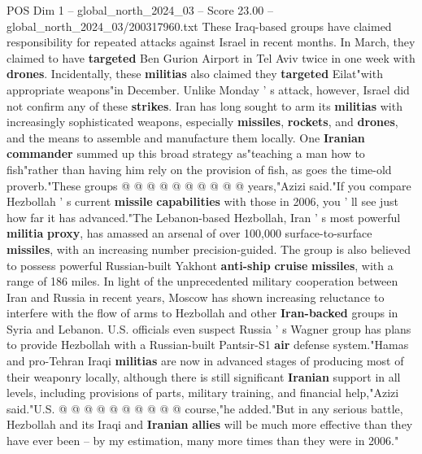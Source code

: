 \begin{textsample}{POS Dim 1 – global\_north\_2024\_03 – Score 23.00 – global\_north\_2024\_03/200317960.txt}
These Iraq-based groups have claimed responsibility for repeated attacks against Israel in recent months.
In March, they claimed to have \textbf{targeted} Ben Gurion Airport in Tel Aviv twice in one week with \textbf{drones}.
Incidentally, these \textbf{militias} also claimed they \textbf{targeted} Eilat"with appropriate weapons"in December.
Unlike Monday ' s attack, however, Israel did not confirm any of these \textbf{strikes}.
Iran has long sought to arm its \textbf{militias} with increasingly sophisticated weapons, especially \textbf{missiles}, \textbf{rockets}, and \textbf{drones}, and the means to assemble and manufacture them locally.
One \textbf{Iranian} \textbf{commander} summed up this broad strategy as"teaching a man how to fish"rather than having him rely on the provision of fish, as goes the time-old proverb."These groups @ @ @ @ @ @ @ @ @ @ years,"Azizi said."If you compare Hezbollah ' s current \textbf{missile} \textbf{capabilities} with those in 2006, you ' ll see just how far it has advanced."The Lebanon-based Hezbollah, Iran ' s most powerful \textbf{militia} \textbf{proxy}, has amassed an arsenal of over 100,000 surface-to-surface \textbf{missiles}, with an increasing number precision-guided.
The group is also believed to possess powerful Russian-built Yakhont \textbf{anti-ship} \textbf{cruise} \textbf{missiles}, with a range of 186 miles.
In light of the unprecedented military cooperation between Iran and Russia in recent years, Moscow has shown increasing reluctance to interfere with the flow of arms to Hezbollah and other \textbf{Iran-backed} groups in Syria and Lebanon.
U.S. officials even suspect Russia ' s Wagner group has plans to provide Hezbollah with a Russian-built Pantsir-S1 \textbf{air} defense system."Hamas and pro-Tehran Iraqi \textbf{militias} are now in advanced stages of producing most of their weaponry locally, although there is still significant \textbf{Iranian} support in all levels, including provisions of parts, military training, and financial help,"Azizi said."U.S. @ @ @ @ @ @ @ @ @ @ course,"he added."But in any serious battle, Hezbollah and its Iraqi and \textbf{Iranian} \textbf{allies} will be much more effective than they have ever been -- by my estimation, many more times than they were in 2006."

\end{textsample}
